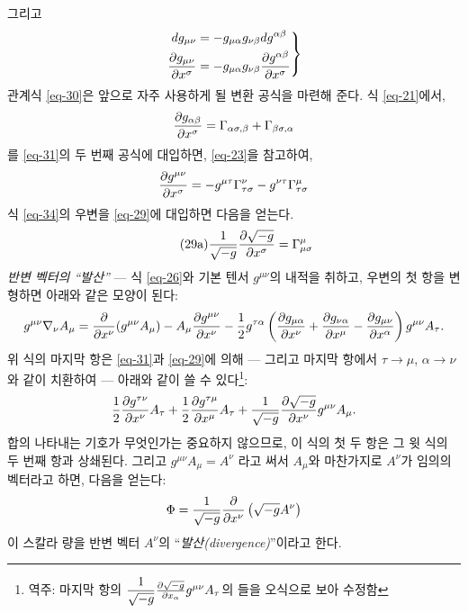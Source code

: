 \documentclass[b5paper]{article}
\begin{document}
그리고
\begin{equation} \label{eq-32}
\left.
\begin{aligned}
dg_{\mu\nu}&=- g_{\mu\alpha} g_{\nu\beta} dg^{\alpha\beta} \\
{\frac{{\partial}{g_{\mu\nu}}}{{\partial}{x^\sigma}}}
&= -g_{\mu\alpha} g_{\nu\beta} {\frac{{\partial}{g^{\alpha\beta}}}{{\partial}{x^\sigma}}}
\end{aligned}
\right\}
\end{equation}
관계식 \eqref{eq-30}은 앞으로 자주 사용하게 될 변환 공식을 마련해 준다.  
식 \eqref{eq-21}에서,
\begin{equation} \label{eq-33}
{\frac{{\partial}{g_{\alpha\beta}}}{{\partial}{x^\sigma}}}=\Gamma_{\alpha\sigma,\beta}+\Gamma_{\beta\sigma,\alpha}
\end{equation}를 \eqref{eq-31}의 두 번째 공식에 대입하면, \eqref{eq-23}을 참고하여,
\begin{equation} \label{eq-34}
{\frac{{\partial}{g^{\mu\nu}}}{{\partial}{x^\sigma}}}
= - g^{\mu\tau} \Gamma_{\tau\sigma}^{\nu} - g^{\nu\tau} \Gamma_{\tau\sigma}^{\mu}
\end{equation}
식 \eqref{eq-34}의 우변을 \eqref{eq-29}에 대입하면 다음을 얻는다.
\begin{equation} \tag{29a} \label{eq-29a}
	\dfrac{1}{\sqrt{-g}}{\frac{{\partial}{\sqrt{-g}}}{{\partial}{x^\sigma}}}
	=\Gamma_{\mu\sigma}^\mu 
\end{equation}
\emph{반변 벡터의 ``발산''} ---
식 \eqref{eq-26}와 기본 텐서 $g^{\mu\nu}$의 내적을 취하고, 우변의 첫 항을 변형하면 아래와 같은 모양이 된다:
\begin{equation*}
	g^{\mu\nu} \nabla_\nu A_\mu = {\frac{{\partial}{}}{{\partial}{x^\nu}}}(g^{\mu\nu}A_\mu)
	- A_\mu {\frac{{\partial}{g^{\mu\nu}}}{{\partial}{x^\nu}}}
	- \frac{1}{2}g^{\tau\alpha}\left(
	{\frac{{\partial}{g_{\mu\alpha}}}{{\partial}{x^\nu}}}
	+ {\frac{{\partial}{g_{\nu\alpha}}}{{\partial}{x^\mu}}}
	- {\frac{{\partial}{g_{\mu\nu}}}{{\partial}{x^\alpha}}}
	\right) g^{\mu\nu} A_\tau .
\end{equation*}
위 식의 마지막 항은 \eqref{eq-31}과 \eqref{eq-29}에 의해 --- 그리고 마지막 항에서 $\tau\rightarrow\mu$, $\alpha\rightarrow\nu$ 와 같이 \ind{}\를 치환하여 --- 아래와 같이 쓸 수 있다\footnote{역주: 마지막 항의 $\dfrac{1}{\sqrt{-g}}{\frac{{\partial}{\sqrt{-g}}}{{\partial}{x_\alpha}}} g^{\mu\nu} A_\tau $의 \ind{}들을 오식으로 보아 수정함}:
\begin{equation*}
	\frac{1}{2} {\frac{{\partial}{g^{\tau\nu}}}{{\partial}{x^\nu}}} A_\tau
	+ \frac{1}{2} {\frac{{\partial}{g^{\tau\mu}}}{{\partial}{x^\mu}}} A_\tau
	+ \dfrac{1}{\sqrt{-g}}{\frac{{\partial}{\sqrt{-g}}}{{\partial}{x^\nu}}} g^{\mu\nu} A_\mu .
\end{equation*}
합의 \ind{}\를 나타내는 기호가 무엇인가는 중요하지 않으므로, 이 식의 첫 두 항은 그 윗 식의 두 번째 항과 상쇄된다. 그리고 $ g^{\mu\nu}A_\mu=A^\nu $ 라고 써서 $ A_\mu $와 마찬가지로 $ A^\nu $가 임의의 벡터라고 하면, 다음을 얻는다:
\begin{equation} \label{eq-35}
	\Phi = \dfrac{1}{\sqrt{-g}}{\frac{{\partial}{}}{{\partial}{x^\nu}}} \left( \sqrt{-g} A^\nu \right)
\end{equation}
이 스칼라 량을 반변 벡터 $A^\nu$의 ``\emph{발산(divergence)}''이라고 한다.
\end{document}
